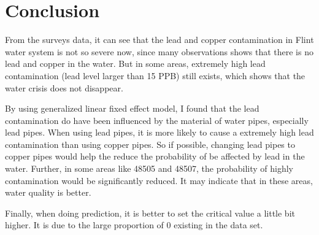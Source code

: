 \documentclass[letterpaper,12pt]{article}
\newcommand{\sihao}{\fontsize{14pt}{\baselineskip}\selectfont}       %
\begin{document}
\section*{\sihao Conclusion}
From the surveys data, it can see that the lead and copper contamination in Flint water system is not so severe now, since many observations shows that there is no lead and copper in the water. But in some areas, extremely high lead contamination (lead level larger than 15 PPB) still exists, which shows that the water crisis does not disappear.

By using generalized linear fixed effect model, I found that the lead contamination do have been influenced by the material of water pipes, especially lead pipes. When using lead pipes, it is more likely to cause a extremely high lead contamination than using copper pipes. So if possible, changing lead pipes to copper pipes would help the reduce the probability of be affected by lead in the water. Further, in some areas like 48505 and 48507, the probability of highly contamination would be significantly reduced. It may indicate that in these areas, water quality is better.

Finally, when doing prediction, it is better to set the critical value a little bit higher. It is due to the large proportion of 0 existing in the data set. 
\end{document}
